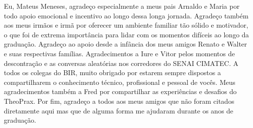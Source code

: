 \begin{agradecimentos}
	Eu, Mateus Meneses, agradeço especialmente a meus pais Arnaldo e Maria por todo apoio emocional e incentivo ao longo dessa longa jornada. Agradeço também aos meus irmãos e irmã por oferecer um ambiente familiar tão sólido e motivador, o que foi de extrema importância para lidar com os momentos difíceis ao longo da graduação. Agradeço ao apoio desde a infância dos meus amigos Renato e Walter e suas respectivas famílias. Agradecimentos a Iure e Vitor pelos momentos de descontração e as conversas aleatórias nos corredores do SENAI CIMATEC. A todos os colegas do BIR, muito obrigado por estarem sempre dispostos a compartilharem o conhecimento técnico, profissional e pessoal de vocês. Meus agradecimentos também a Fred por compartilhar as experiências e desafios do TheoPrax. Por fim, agradeço a todos aos meus amigos que não foram citados diretamente aqui mas que de alguma forma me ajudaram durante os anos de graduação.
\end{agradecimentos}